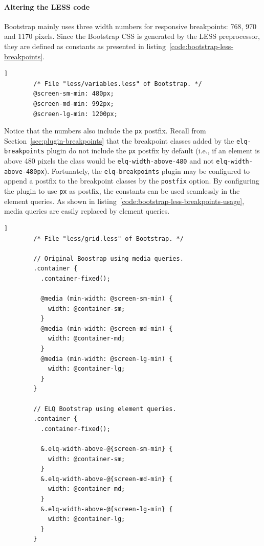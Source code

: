\documentclass[a4paper,11pt]{kth-mag}
\newcommand{\code}[1]{\texttt{#1}}
\begin{document}
      \paragraph{Altering the LESS code}
      \gls{Bootstrap} mainly uses three width numbers for \gls{responsive} breakpoints: 768, 970 and 1170 pixels.
      Since the \gls{Bootstrap} \gls{CSS} is generated by the \gls{LESS} preprocessor, they are defined as constants as presented in listing~\ref{code:bootstrap-less-breakpoints}.
      \begin{lstlisting}[gobble=8,label={code:bootstrap-less-breakpoints},caption={The main breakpoints used by \gls{Bootstrap} defined as \gls{LESS} constants.},captionpos=b]]
        /* File "less/variables.less" of Bootstrap. */
        @screen-sm-min: 480px;
        @screen-md-min: 992px;
        @screen-lg-min: 1200px;
      \end{lstlisting}
      Notice that the numbers also include the \code{px} postfix.
      Recall from Section~\ref{sec:plugin-breakpoints} that the breakpoint classes added by the \code{elq-breakpoints} plugin do not include the \code{px} postfix by default (i.e., if an element is above 480 pixels the class would be \code{elq-width-above-480} and not \code{elq-width-above-480px}).
      Fortunately, the \code{elq-breakpoints} plugin may be configured to append a postfix to the breakpoint classes by the \code{postfix} option.
      By configuring the plugin to use \code{px} as postfix, the constants can be used seamlessly in the element queries.
      As shown in listing~\ref{code:bootstrap-less-breakpoints-usage}, \gls{media queries} are easily replaced by element queries.
      \begin{lstlisting}[gobble=8,label={code:bootstrap-less-breakpoints-usage},caption={Media queries can easily be replaced with element queries. By using the \code{elq-breakpoints} postfix option, the breakpoint constants can be used directly in the selectors.},captionpos=b]]
        /* File "less/grid.less" of Bootstrap. */

        // Original Boostrap using media queries.
        .container {
          .container-fixed();

          @media (min-width: @screen-sm-min) {
            width: @container-sm;
          }
          @media (min-width: @screen-md-min) {
            width: @container-md;
          }
          @media (min-width: @screen-lg-min) {
            width: @container-lg;
          }
        }

        // ELQ Bootstrap using element queries.
        .container {
          .container-fixed();

          &.elq-width-above-@{screen-sm-min} {
            width: @container-sm;
          }
          &.elq-width-above-@{screen-md-min} {
            width: @container-md;
          }
          &.elq-width-above-@{screen-lg-min} {
            width: @container-lg;
          }
        }
      \end{lstlisting}
\end{document}
